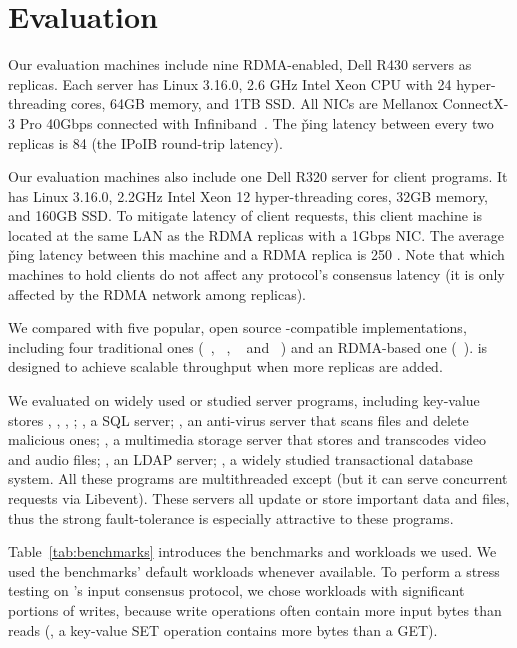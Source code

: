 \section{Evaluation} \label{sec:evaluation}





Our evaluation machines include nine RDMA-enabled, Dell R430 servers as \paxos 
replicas. Each server has Linux 3.16.0, 2.6 GHz Intel Xeon CPU with 24 
hyper-threading cores, 64GB memory, and 1TB SSD. All NICs are Mellanox 
ConnectX-3 Pro 40Gbps connected with Infiniband~\cite{infiniband}. 
The \v{ping} latency between every two replicas is 84 \us (the IPoIB 
round-trip latency).
%

Our evaluation machines also include one Dell R320 server for client programs. 
It has Linux 3.16.0, 2.2GHz Intel Xeon 12 hyper-threading cores, 32GB memory, 
and 160GB SSD. To mitigate latency of client requests, this client machine is 
located at the same LAN as the RDMA replicas with a 1Gbps NIC. The average 
\v{ping} latency between this machine and a RDMA replica is 250 \us. Note that 
which machines to hold clients do not affect any \paxos protocol's consensus 
latency (it is only affected by the RDMA network among replicas).

We compared \xxx with five popular, open source \paxos-compatible 
implementations,
including four traditional ones (\libpaxos~\cite{libpaxos},
\zookeeper~\cite{zookeeper}, \crane~\cite{crane:sosp15} and
\spaxos~\cite{spaxos:srds12}) and an RDMA-based one 
(\dare~\cite{dare:hpdc15}). \spaxos is designed to achieve scalable throughput 
when more replicas are added. 

We evaluated \xxx on \nprog widely used or studied server programs, including
\nkvprog key-value stores \redis, \memcached, \ssdb, \mongodb; \mysql, a SQL
server; \clamav, an anti-virus server that scans files and delete malicious ones;
\mediatomb, a multimedia storage server that stores and transcodes video and
audio files; \openldap, an LDAP server; \calvin, a widely studied transactional
database system. All these programs are multithreaded except \redis (but it can 
serve concurrent requests via Libevent). These servers all update or store 
important data and files, thus the strong \paxos fault-tolerance is especially 
attractive to these programs.


Table~\ref{tab:benchmarks} introduces the benchmarks and workloads we used. We 
used the benchmarks' default workloads whenever available. To perform a stress 
testing on \xxx's input consensus protocol, we chose workloads with significant 
portions of writes, because write operations often contain more input bytes 
than reads (\eg, a key-value SET operation contains more bytes than a GET).

